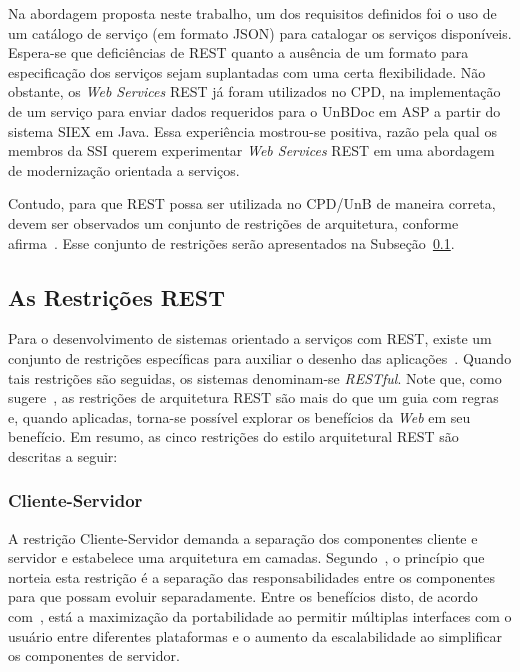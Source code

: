 Na abordagem proposta neste trabalho, um dos requisitos definidos foi o uso de um catálogo de serviço (em formato \acrshort{JSON}) para catalogar os serviços disponíveis. Espera-se que deficiências de \acrshort{REST} quanto a ausência de um formato para especificação dos serviços sejam suplantadas com uma certa flexibilidade. Não obstante, os \textit{Web Services} \acrshort{REST} já foram utilizados no \acrshort{CPD}, na implementação de um serviço para enviar dados requeridos para o \acrfull{UnBDoc} em ASP a partir do sistema \acrshort{SIEX} em Java. Essa experiência mostrou-se positiva, razão pela qual os membros da \acrfull{SSI} querem experimentar \textit{Web Services} \acrshort{REST} em uma abordagem de modernização orientada a serviços. 

Contudo, para que \acrshort{REST} possa ser utilizada no CPD/UnB de maneira correta, devem ser observados um conjunto de restrições de arquitetura, conforme afirma~\cite{fielding2000architectural}. Esse conjunto de restrições 
serão apresentados na Subseção~\ref{restricoes_rest}.



\subsection{As Restrições REST} \label{restricoes_rest}%

Para o desenvolvimento de sistemas orientado a serviços com \acrshort{REST}, existe um conjunto de restrições específicas para auxiliar o desenho das aplicações~\cite{fielding2000architectural}. Quando tais restrições são seguidas, os sistemas denominam-se \textit{RESTful}. Note que, como
sugere~\cite{flanders2008restful, RestApiDesign:2011}, as restrições de arquitetura \acrshort{REST} 
são mais do que um guia com regras e, quando aplicadas, 
torna-se possível explorar os benefícios da \textit{Web} em seu benefício.
Em resumo, as cinco restrições do estilo arquitetural \acrshort{REST} são descritas a seguir:


\subsubsection{Cliente-Servidor} 

A restrição Cliente-Servidor demanda 
a separação dos componentes cliente e servidor e estabelece uma arquitetura em camadas. 
Segundo~\cite{fielding2000architectural}, o princípio que norteia 
esta restrição é a separação das responsabilidades entre os componentes para que 
possam evoluir separadamente. Entre os benefícios disto, de 
acordo com~\cite{ModelDriApproRest:2014}, está a maximização da portabilidade 
ao permitir múltiplas interfaces com o usuário entre diferentes plataformas 
e o aumento da escalabilidade ao simplificar os componentes de servidor.

